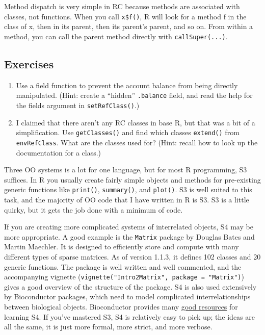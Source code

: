 Method dispatch is very simple in RC because methods are associated with
classes, not functions. When you call \texttt{x\$f()}, R will look for a
method f in the class of x, then in its parent, then its parent's
parent, and so on. From within a method, you can call the parent method
directly with \texttt{callSuper(...)}. 

\subsection{Exercises}

\begin{enumerate}
\def\labelenumi{\arabic{enumi}.}
\item
  Use a field function to prevent the account balance from being
  directly manipulated. (Hint: create a ``hidden'' \texttt{.balance}
  field, and read the help for the fields argument in
  \texttt{setRefClass()}.)
\item
  I claimed that there aren't any RC classes in base R, but that was a
  bit of a simplification. Use \texttt{getClasses()} and find which
  classes \texttt{extend()} from \texttt{envRefClass}. What are the
  classes used for? (Hint: recall how to look up the documentation for a
  class.)
\end{enumerate}


Three OO systems is a lot for one language, but for most R programming,
S3 suffices. In R you usually create fairly simple objects and methods
for pre-existing generic functions like \texttt{print()},
\texttt{summary()}, and \texttt{plot()}. S3 is well suited to this task,
and the majority of OO code that I have written in R is S3. S3 is a
little quirky, but it gets the job done with a minimum of code.

If you are creating more complicated systems of interrelated objects, S4
may be more appropriate. A good example is the \texttt{Matrix} package
by Douglas Bates and Martin Maechler. It is designed to efficiently
store and compute with many different types of sparse matrices. As of
version 1.1.3, it defines 102 classes and 20 generic functions. The
package is well written and well commented, and the accompanying
vignette (\texttt{vignette("Intro2Matrix", package = "Matrix")}) gives a
good overview of the structure of the package. S4 is also used
extensively by Bioconductor packages, which need to model complicated
interrelationships between biological objects. Bioconductor provides
many \href{https://www.google.com/search?q=bioconductor+s4}{good
resources} for learning S4. If you've mastered S3, S4 is relatively easy
to pick up; the ideas are all the same, it is just more formal, more
strict, and more verbose.

